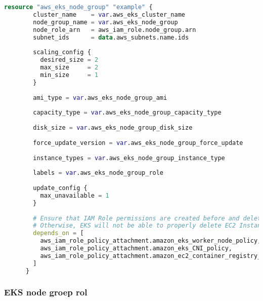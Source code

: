 \begin{lstlisting}[language=terraform]
    resource "aws_eks_node_group" "example" {
        cluster_name    = var.aws_eks_cluster_name
        node_group_name = var.aws_eks_node_group
        node_role_arn   = aws_iam_role.node_group.arn
        subnet_ids      = data.aws_subnets.name.ids
      
        scaling_config {
          desired_size = 2
          max_size     = 2
          min_size     = 1
        }
      
        ami_type = var.aws_eks_node_group_ami
      
        capacity_type = var.aws_eks_node_group_capacity_type
      
        disk_size = var.aws_eks_node_group_disk_size
      
        force_update_version = var.aws_eks_node_group_force_update
      
        instance_types = var.aws_eks_node_group_instance_type
        
        labels = var.aws_eks_node_group_role
      
        update_config {
          max_unavailable = 1
        }
      
        # Ensure that IAM Role permissions are created before and deleted after EKS Node Group handling.
        # Otherwise, EKS will not be able to properly delete EC2 Instances and Elastic Network Interfaces.
        depends_on = [
          aws_iam_role_policy_attachment.amazon_eks_worker_node_policy,
          aws_iam_role_policy_attachment.amazon_eks_CNI_policy,
          aws_iam_role_policy_attachment.amazon_ec2_container_registry_readonly,
        ]
      } 
\end{lstlisting}

\subsubsection{
{EKS node groep rol}}
\label{sec:EKS node groep policies}

